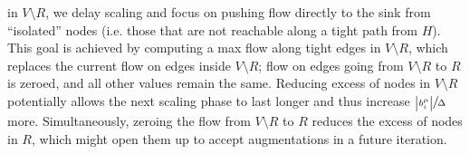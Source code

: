 \documentclass[11pt]{article}
\makeatletter
\let\comment\todo
\newcommand{\frank}[1]{\comment[nolist,color=blue!40]{@frank\\ #1}}
\newcommand{\katie}[1]{\comment[nolist,color=green!40]{@katie\\ #1}}
\theoremstyle{definition}
\theoremstyle{definition}
\theoremstyle{definition}
\newcommand{\biu}{b_{i}^{\mu}}
\newcommand{\filtration}{\textsc{De-Isolation}}
\newcommand{\es}{\textsc{Scaling}}
\newcommand{\rewrite}[1]{\textcolor{red}{#1}}
\renewcommand{\todo}[1]{\hl{TODO: #1}}
\makeatother
\begin{document}
\begin{itemize}
in $V \setminus R$, we delay scaling and focus on pushing
flow directly to the sink from ``isolated''
nodes (i.e. those that are not reachable along a tight path from $H$).
This goal is achieved by computing a max flow along tight edges in $V \setminus R$,
which
replaces the current flow on edges
inside $V \setminus R$; flow on edges going from $V \setminus R$ to $R$ is zeroed,
and all other values remain the same. Reducing excess of nodes in
$V \setminus R$ potentially allows the next scaling phase to last longer and
thus increase $\sfrac{\abs{\biu}}{\Delta}$ more.
Simultaneously, zeroing the flow from $V\setminus R$ to $R$
reduces the excess of nodes in $R$, which might open them up to accept augmentations
in a future iteration.
\end{itemize}


\end{document}
